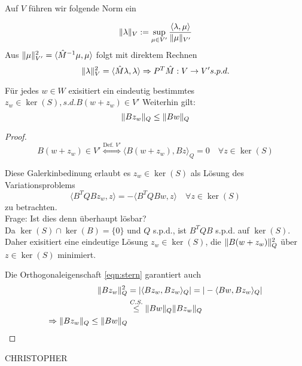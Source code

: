 Auf $V$ führen wir folgende Norm ein 
\begin{definition}
  \[
    \|\lambda\|_V:=\sup_{\mu\in V'} \frac{\langle \lambda, \mu\rangle}{\|\mu\|_{V'}}
  \]
  Aus $\|\mu\|_{V'}^2 = \langle \hat{M}^{-1}\mu, \mu\rangle$ folgt mit direktem Rechnen
  \[
    \|\lambda\|_V^2 = \langle \hat{M}\lambda,\lambda\rangle \\
    \Rightarrow P^T\hat{M}: V\to V's.p.d.
  \]
\end{definition}

\begin{lemma}
  Für jedes $w\in W$ exisitiert ein eindeutig bestimmtes $z_w\in \ker(S), s.d. B(w+z_w)\in V'$
  Weiterhin gilt: %
  \[
    \|Bz_w\|_Q \leq \|Bw\|_Q
  \]
  \label{}
\end{lemma}

\begin{proof}
  \[
    B(w+z_w)\in V' \overset{\text{Def. } V'}{\Leftrightarrow} \langle B(w+z_w), Bz\rangle_Q = 0 \quad \forall z\in \ker(S)
  \]

  Diese Galerkinbedinung erlaubt es $z_w\in \ker(S)$ als Lösung des Variationsproblems 
  \begin{equation}
    \label{eqn:stern}
    \tag{$*$}
    \langle B^TQBz_w,z\rangle = -\langle B^TQBw,z\rangle \quad \forall z\in\ker(S)
  \end{equation}
  zu betrachten.\\
  
  Frage: Ist dies denn überhaupt lösbar? \\

  Da $\ker(S) \cap \ker(B) = \{0\}$ und $Q$ s.p.d., ist $B^TQB$ s.p.d. auf $\ker(S)$. Daher exisitiert eine eindeutige Lösung $z_w\in\ker(S)$, die $\|B(w+z_w)\|_Q^2$ über $z\in\ker(S)$ minimiert. 
  
  Die Orthogonaleigenschaft \eqref{eqn:stern} garantiert auch
  \begin{align*}
    \|Bz_w\|_Q^2 &= |\langle Bz_w,Bz_w\rangle_Q| = |-\langle Bw, Bz_w\rangle_Q|\\
    &\overset{C.S.}{\leq} \|Bw\|_Q \|Bz_w\|_Q\\
    \Rightarrow \|Bz_w\|_Q \leq \|Bw\|_Q
  \end{align*}
\end{proof}

CHRISTOPHER
